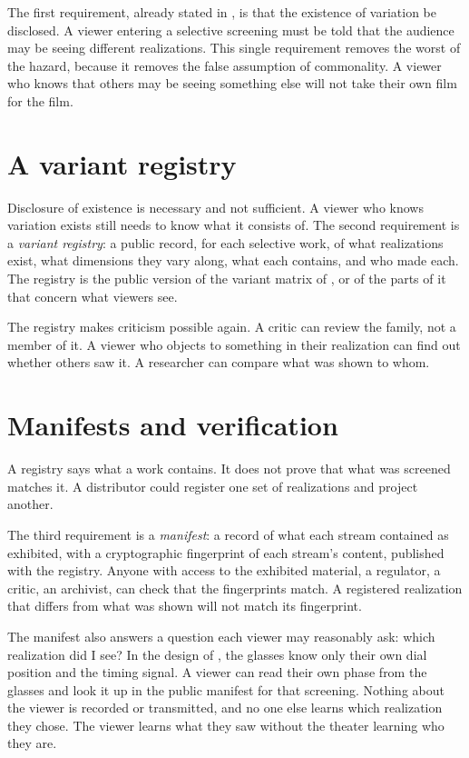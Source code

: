 The first requirement, already stated in , is that the existence of variation be disclosed. A viewer entering a selective screening must be told that the audience may be seeing different realizations. This single requirement removes the worst of the hazard, because it removes the false assumption of commonality. A viewer who knows that others may be seeing something else will not take their own film for the film.

\section{A variant registry}

Disclosure of existence is necessary and not sufficient. A viewer who knows variation exists still needs to know what it consists of. The second requirement is a \emph{variant registry}: a public record, for each selective work, of what realizations exist, what dimensions they vary along, what each contains, and who made each. The registry is the public version of the variant matrix of , or of the parts of it that concern what viewers see.

The registry makes criticism possible again. A critic can review the family, not a member of it. A viewer who objects to something in their realization can find out whether others saw it. A researcher can compare what was shown to whom.

\section{Manifests and verification}

A registry says what a work contains. It does not prove that what was screened matches it. A distributor could register one set of realizations and project another.

The third requirement is a \emph{manifest}: a record of what each stream contained as exhibited, with a cryptographic fingerprint of each stream's content, published with the registry. Anyone with access to the exhibited material, a regulator, a critic, an archivist, can check that the fingerprints match. A registered realization that differs from what was shown will not match its fingerprint.

The manifest also answers a question each viewer may reasonably ask: which realization did I see? In the design of , the glasses know only their own dial position and the timing signal. A viewer can read their own phase from the glasses and look it up in the public manifest for that screening. Nothing about the viewer is recorded or transmitted, and no one else learns which realization they chose. The viewer learns what they saw without the theater learning who they are.

